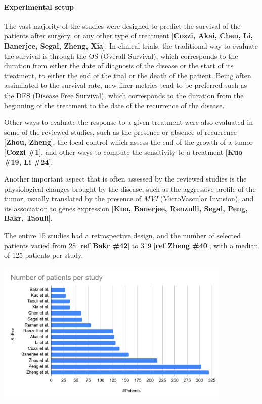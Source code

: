 \documentclass[]{article}
\let\oldparagraph\paragraph
\renewcommand{\paragraph}[1]{\oldparagraph{#1}\mbox{}}
\begin{document}
\paragraph{Experimental setup}\label{experimental-setup}

The vast majority of the studies were designed to predict the survival
of the patients after surgery, or any other type of treatment
{[}\textbf{Cozzi, Akai, Chen, Li, Banerjee, Segal, Zheng, Xia}{]}. In
clinical trials, the traditional way to evaluate the survival is through
the OS (Overall Survival), which corresponds to the duration from either
the date of diagnosis of the disease or the start of its treatment, to
either the end of the trial or the death of the patient. Being often
assimilated to the survival rate, new finer metrics tend to be preferred
such as the DFS (Disease Free Survival), which corresponds to the
duration from the beginning of the treatment to the date of the
recurrence of the disease.

Other ways to evaluate the response to a given treatment were also
evaluated in some of the reviewed studies, such as the presence or
absence of recurrence {[}\textbf{Zhou, Zheng}{]}, the local control
which assess the end of the growth of a tumor {[}\textbf{Cozzi \#1}{]},
and other ways to compute the sensitivity to a treatment {[}\textbf{Kuo
\#19, Li \#24}{]}.

Another important aspect that is often assessed by the reviewed studies
is the physiological changes brought by the disease, such as the
aggressive profile of the tumor, usually translated by the presence of
\emph{MVI} (MicroVascular Invasion), and its association to genes
expression {[}\textbf{Kuo, Banerjee, Renzulli, Segal, Peng, Bakr,
Taouli}{]}.

The entire 15 studies had a retrospective design, and the number of
selected patients varied from 28 {[}\textbf{ref Bakr \#42}{]} to 319
{[}\textbf{ref Zheng \#40}{]}, with a median of 125 patients per study.

\includegraphics[width=4.41572in,height=2.72865in]{./images/image2.png}
\end{document}
